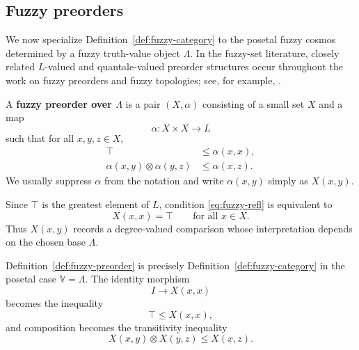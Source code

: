 \subsection{Fuzzy preorders}
\label{subsec:fuzzy-preorders}

We now specialize Definition~\ref{def:fuzzy-category} to the posetal fuzzy cosmos determined by a fuzzy truth-value object \(\Lambda\). In the fuzzy-set literature, closely related \(L\)-valued and quantale-valued preorder structures occur throughout the work on fuzzy preorders and fuzzy topologies; see, for example, \cite{LaiZhang2006FuzzyPreorderTopology,pu-zhang-2012-gl-monoid}.

\begin{definition}\label{def:fuzzy-preorder}
    A \textbf{fuzzy preorder over \(\Lambda\)} is a pair \((X,\alpha)\) consisting of a small set \(X\) and a map
    \[
        \alpha:X\times X\to L
    \]
    such that for all \(x,y,z\in X\),
    \begin{align}
        \top &\leq \alpha(x,x),\label{eq:fuzzy-refl}\\
        \alpha(x,y)\otimes \alpha(y,z)&\leq \alpha(x,z).
        \label{eq:fuzzy-trans}
    \end{align}
    We usually suppress \(\alpha\) from the notation and write \(\alpha(x,y)\) simply as \(X(x,y)\).
\end{definition}

Since \(\top\) is the greatest element of \(L\), condition \eqref{eq:fuzzy-refl} is equivalent to
\[
    X(x,x)=\top
    \qquad
    \text{for all }x\in X.
\]
Thus \(X(x,y)\) records a degree-valued comparison whose interpretation depends on the chosen base \(\Lambda\).

\begin{remark}\label{rem:enriched-viewpoint}
    Definition~\ref{def:fuzzy-preorder} is precisely Definition~\ref{def:fuzzy-category} in the posetal case \(\mathbb V=\Lambda\). The identity morphism
    \[
        I\longrightarrow X(x,x)
    \]
    becomes the inequality
    \[
        \top\leq X(x,x),
    \]
    and composition becomes the transitivity inequality
    \[
        X(x,y)\otimes X(y,z)\leq X(x,z).
    \]
\end{remark}

